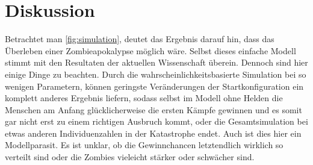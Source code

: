 \section{Diskussion} %
    \label{sec:diskussion}
    Betrachtet man \autoref{fig:simulation}, deutet das Ergebnis darauf hin, dass das Überleben einer Zombieapokalypse möglich wäre. Selbst dieses einfache Modell stimmt mit den Resultaten der aktuellen Wissenschaft überein. Dennoch sind hier einige Dinge zu beachten. Durch die wahrscheinlichkeitsbasierte Simulation bei so wenigen Parametern, können geringste Veränderungen der Startkonfiguration ein komplett anderes Ergebnis liefern, sodass selbst im Modell ohne Helden die Menschen am Anfang glücklicherweise die ersten Kämpfe gewinnen und es somit gar nicht erst zu einem richtigen Ausbruch kommt, oder die Gesamtsimulation bei etwas anderen Individuenzahlen in der Katastrophe endet. Auch ist dies hier ein Modellparasit. Es ist unklar, ob die Gewinnchancen letztendlich wirklich so verteilt sind oder die Zombies vieleicht stärker oder schwächer sind.

